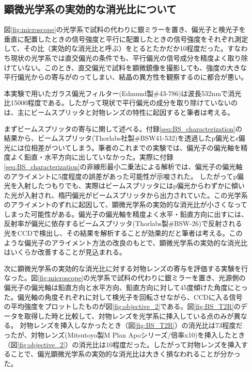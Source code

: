 \documentclass[11pt,a4paper]{jsarticle}
\begin{document}
\subsection{顕微光学系の実効的な消光比について}
図\ref{fig:microscope}の光学系で試料の代わりに銀ミラーを置き、偏光子と検光子を垂直に配置したときの信号強度と平行に配置したときの信号強度をそれぞれ測定して、その比（実効的な消光比と呼ぶ）をとるとたかだか10程度だった。すなわち現状の光学系では直交偏光の条件でも、平行偏光の信号成分を精度よく取り除けていない。このとき、直交偏光で試料を顕微鏡像を撮影しても、強度の大きな平行偏光からの寄与がのってしまい、結晶の異方性を観察するのに都合が悪い。

本実験で用いたガラス偏光フィルター(Edmund製\#43-786)は波長532nmで消光比15000程度である。したがって現状で平行偏光の成分を取り除けていないのは、主にビームスプリッタと対物レンズの特性に起因すると筆者は考える。

まずビームスプリッタの寄与に関して述べる。付録\ref{seq:BS_characterization}の結果から、ビームスプリッタ(Thorlabs社製\#BSW41-532)を透過したp偏光とs偏光には位相差がついてしまう。筆者のこれまでの実験では、偏光子の偏光軸を精度よく鉛直・水平方向に出していなかった。実際に付録\ref{seq:BS_characterization}の非線形最小二乗法による解析では、偏光子の偏光軸のアライメントに5度程度の誤差があった可能性が示唆された。 したがってp偏光を入射したつもりでも、実際はビームスプリッタにはp偏光からわずかに傾いた光が入射され、楕円偏光がビームスプリッタから出力されていた。この光学系のアライメントのずれに起因して、顕微光学系の実効的な消光比が小さくなってしまった可能性がある。偏光子の偏光軸を精度よく水平・鉛直方向に出すには、反射率が偏光に依存するビームスプリッタ(Thorlabs製\#BSW-26)で反射される光をCCDで検出し、その結果を解析することが効果的だと筆者は考える。このような偏光子のアライメント方法の改良のもとで、顕微光学系の実効的な消光比はいくらか改善することが見込まれる。

次に顕微光学系の実効的な消光比に対する対物レンズの寄与を評価する実験を行なった。図\ref{fig:microscope}の光学系で試料の代わりに銀ミラーを置き、光源側の偏光子の偏光軸は鉛直方向と水平方向、鉛直方向に対して45度傾けた角度にとった。偏光軸の角度それぞれに対して検光子を回転させながら、CCDに入る信号の平均強度をプロットしたものが図\ref{fig:objective_2}である。図\ref{fig:BS_T2R}のデータを取得した時と比較して、対物レンズを光学系に挿入している点のみが異なる。
対物レンズを挿入しなかったとき（図\ref{fig:BS_T2R}）の消光比は73程度だったが、対物レンズ(Mitsutoyo製M Plan Apoシリーズ/倍率x10)を挿入したとき（図\ref{fig:objective_2}）の消光比は10程度だった。したがって対物レンズを挿入することで、偏光顕微光学系の実効的な消光比は大きく損なわれることが分かった。
\end{document}
